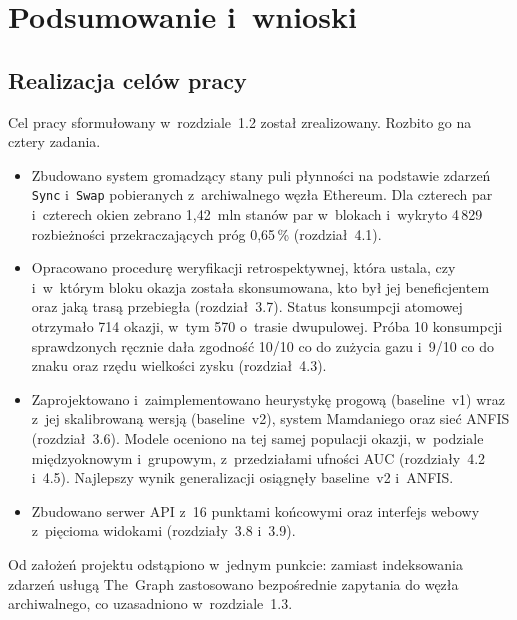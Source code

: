 \newpage
\section{Podsumowanie i~wnioski}

\subsection{Realizacja celów pracy}
Cel pracy sformułowany w~rozdziale~1.2 został zrealizowany. Rozbito go na cztery zadania.
\begin{itemize}[nosep]
  \item Zbudowano system gromadzący stany puli płynności na podstawie zdarzeń \texttt{Sync}
        i~\texttt{Swap} pobieranych z~archiwalnego węzła Ethereum. Dla czterech par i~czterech
        okien zebrano 1,42~mln stanów par w~blokach i~wykryto 4\,829 rozbieżności
        przekraczających próg 0,65\,\% (rozdział~4.1).
  \item Opracowano procedurę weryfikacji retrospektywnej, która ustala, czy i~w~którym bloku
        okazja została skonsumowana, kto był jej beneficjentem oraz jaką trasą przebiegła
        (rozdział~3.7). Status konsumpcji atomowej otrzymało 714 okazji, w~tym 570 o~trasie
        dwupulowej. Próba 10 konsumpcji sprawdzonych ręcznie dała zgodność 10/10 co do zużycia
        gazu i~9/10 co do znaku oraz rzędu wielkości zysku (rozdział~4.3).
  \item Zaprojektowano i~zaimplementowano heurystykę progową (baseline~v1) wraz z~jej
        skalibrowaną wersją (baseline~v2), system Mamdaniego oraz sieć ANFIS (rozdział~3.6).
        Modele oceniono na tej samej populacji okazji, w~podziale międzyoknowym i~grupowym,
        z~przedziałami ufności AUC (rozdziały~4.2 i~4.5). Najlepszy wynik generalizacji
        osiągnęły baseline~v2 i~ANFIS.
  \item Zbudowano serwer API z~16 punktami końcowymi oraz interfejs webowy z~pięcioma widokami
        (rozdziały~3.8 i~3.9).
\end{itemize}
Od założeń projektu odstąpiono w~jednym punkcie: zamiast indeksowania zdarzeń usługą The~Graph
zastosowano bezpośrednie zapytania do węzła archiwalnego, co uzasadniono w~rozdziale~1.3.

